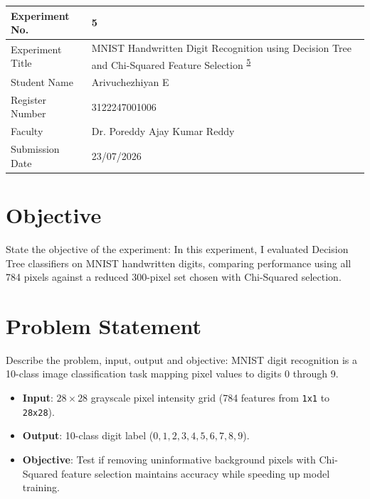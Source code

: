 \documentclass[12pt,a4paper]{article}
\begin{document}
\newpage


\begin{tabular}{|p{4cm}|p{11cm}|}
\hline
Experiment No. & 5 \\ \hline
Experiment Title & MNIST Handwritten Digit Recognition using Decision Tree and Chi-Squared Feature Selection \textsuperscript{\href{https://github.com/arivuchezhiyan/Machine_Learning}{5}} \\ \hline
Student Name & Arivuchezhiyan E \\ \hline
Register Number & 3122247001006 \\ \hline
Faculty & Dr. Poreddy Ajay Kumar Reddy \\ \hline
Submission Date & 23/07/2026 \\ \hline
\end{tabular}

\section{Objective}
State the objective of the experiment:
In this experiment, I evaluated Decision Tree classifiers on MNIST handwritten digits, comparing performance using all 784 pixels against a reduced 300-pixel set chosen with Chi-Squared selection.

\section{Problem Statement}
Describe the problem, input, output and objective:
MNIST digit recognition is a 10-class image classification task mapping pixel values to digits 0 through 9.
\begin{itemize}
\item \textbf{Input}: $28 \times 28$ grayscale pixel intensity grid (784 features from \texttt{1x1} to \texttt{28x28}).
\item \textbf{Output}: 10-class digit label ($0, 1, 2, 3, 4, 5, 6, 7, 8, 9$).
\item \textbf{Objective}: Test if removing uninformative background pixels with Chi-Squared feature selection maintains accuracy while speeding up model training.
\end{itemize}
\end{document}
